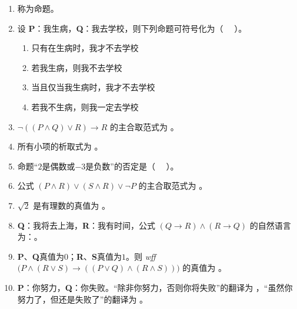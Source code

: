 \begin{enumerate}
	\item \underline{\hspace{6em}}称为命题。
	
	\item 设 \textbf{P}：我生病，\textbf{Q}：我去学校，则下列命题可符号化为（ \ \ ）。
	
	\begin{enumerate}
		\item[（1）] 只有在生病时，我才不去学校
		\item[（2）] 若我生病，则我不去学校
		\item[（3）] 当且仅当我生病时，我才不去学校
		\item[（4）] 若我不生病，则我一定去学校
	\end{enumerate}
	
	\item $\neg((P\land Q)\lor R)\to R$ 的主合取范式为 \underline{\hspace{8em}}。
	
	\item 所有小项的析取式为 \underline{\hspace{8em}}。
	
	\item 命题“$2$是偶数或$-3$是负数”的否定是（ \ \ ）。
	
	\item 公式 $(P\land R)\lor(S\land R)\lor\neg P$ 的主合取范式为 \underline{\hspace{8em}}。
	
	\item $\sqrt{2}$ 是有理数的真值为 \underline{\hspace{6em}}。
	
	\item \textbf{Q}：我将去上海，\textbf{R}：我有时间，公式 $(Q\to R)\land(R\to Q)$ 的自然语言为：\underline{\hspace{8em}}。
	
	\item \textbf{P}、\textbf{Q}真值为$0$；\textbf{R}、\textbf{S}真值为$1$。则 \textit{wff} $ \bigl(P\land(R\lor S)\to((P\lor Q)\land(R\land S))\bigr)$ 的真值为 \underline{\hspace{10em}}。
	
	\item \textbf{P}：你努力，\textbf{Q}：你失败。“除非你努力，否则你将失败”的翻译为 \underline{\hspace{3em}}，“虽然你努力了，但还是失败了”的翻译为 \underline{\hspace{8em}}。
	

\end{enumerate}
